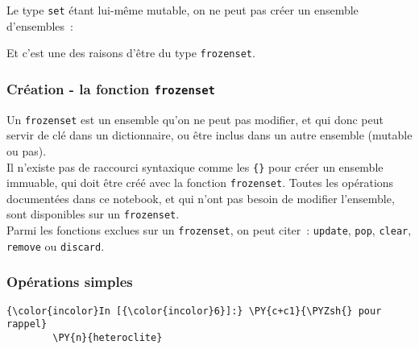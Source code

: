     Le type \texttt{set} étant lui-même mutable, on ne peut pas créer un
ensemble d'ensembles~:

    \begin{Shaded}
\begin{Highlighting}[]
\OperatorTok{>>>}\OperatorTok{=}\NormalTok{ \{\{}\NormalTok{, }\NormalTok{\}\}}
\NormalTok{, } \OperatorTok{<}\OperatorTok{>}
\NormalTok{: }
\end{Highlighting}
\end{Shaded}

    Et c'est une des raisons d'être du type \texttt{frozenset}.

    \hypertarget{cruxe9ation---la-fonction-frozenset}{%
\subsubsection{\texorpdfstring{Création - la fonction
\texttt{frozenset}}{Création - la fonction frozenset}}\label{cruxe9ation---la-fonction-frozenset}}

    Un \texttt{frozenset} est un ensemble qu'on ne peut pas modifier, et qui
donc peut servir de clé dans un dictionnaire, ou être inclus dans un
autre ensemble (mutable ou pas).\\

    Il n'existe pas de raccourci syntaxique comme les \texttt{\{\}} pour
créer un ensemble immuable, qui doit être créé avec la fonction
\texttt{frozenset}. Toutes les opérations documentées dans ce notebook,
et qui n'ont pas besoin de modifier l'ensemble, sont disponibles sur un
\texttt{frozenset}.\\

Parmi les fonctions exclues sur un \texttt{frozenset}, on peut citer~:
\texttt{update}, \texttt{pop}, \texttt{clear}, \texttt{remove} ou
\texttt{discard}.

    \hypertarget{opuxe9rations-simples}{%
\subsubsection{Opérations simples}\label{opuxe9rations-simples}}

    \begin{Verbatim}[commandchars=\\\{\}]
{\color{incolor}In [{\color{incolor}6}]:} \PY{c+c1}{\PYZsh{} pour rappel}
        \PY{n}{heteroclite}
\end{Verbatim}


